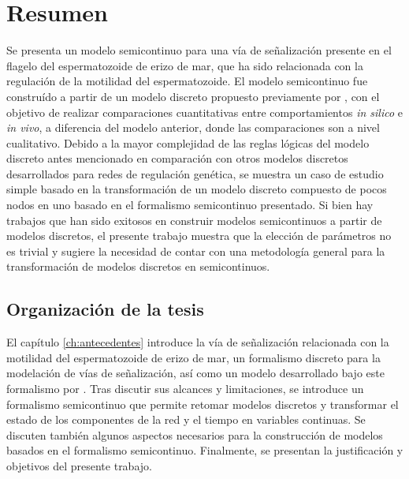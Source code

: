 \begingroup
\let\clearpage\relax
\let\cleardoublepage\relax
\let\cleardoublepage\relax

\chapter*{Resumen}

Se presenta un modelo semicontinuo para una vía de señalización presente en el flagelo del espermatozoide de erizo de mar, que ha sido relacionada con la regulación de la motilidad del espermatozoide. El modelo semicontinuo fue construído a partir de un modelo discreto propuesto previamente por \citeauthor{Espinal2011} \citep{Espinal2011}, con el objetivo de realizar comparaciones cuantitativas entre comportamientos \emph{in silico} e \emph{in vivo}, a diferencia del modelo anterior, donde las comparaciones son a nivel cualitativo. Debido a la mayor complejidad de las reglas lógicas del modelo discreto antes mencionado en comparación con otros modelos discretos desarrollados para redes de regulación genética, se muestra un caso de estudio simple basado en la transformación de un modelo discreto compuesto de pocos nodos en uno basado en el formalismo semicontinuo presentado. Si bien hay trabajos que han sido exitosos en construir modelos semicontinuos a partir de modelos discretos, el presente trabajo muestra que la elección de parámetros no es trivial y sugiere la necesidad de contar con una metodología general para la transformación de modelos discretos en semicontinuos.

\section*{Organización de la tesis}

El capítulo \ref{ch:antecedentes} introduce la vía de señalización relacionada con la motilidad del espermatozoide de erizo de mar, un formalismo discreto para la modelación de vías de señalización, así como un modelo desarrollado bajo este formalismo por \citeauthor{Espinal2011} \citep{Espinal2011}. Tras discutir sus alcances y limitaciones, se introduce un formalismo semicontinuo que permite retomar modelos discretos y transformar el estado de los componentes de la red y el tiempo en variables continuas. Se discuten también algunos aspectos necesarios para la construcción de modelos basados en el formalismo semicontinuo. Finalmente, se presentan la justificación y objetivos del presente trabajo.

